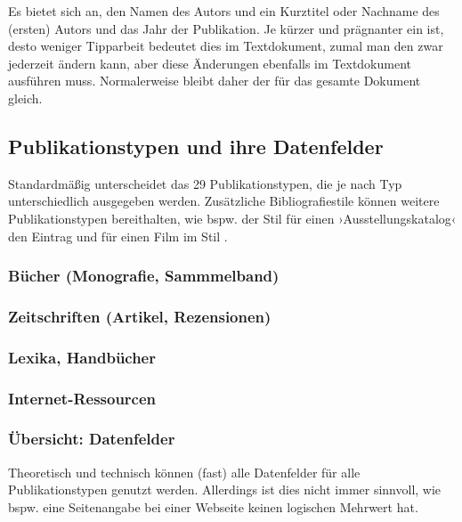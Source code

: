 Es bietet sich an, den Namen des Autors und ein Kurztitel oder Nachname des (ersten) Autors und das Jahr der Publikation. 
Je kürzer und prägnanter ein  ist, desto weniger Tipparbeit bedeutet dies im Textdokument, zumal man den  zwar jederzeit ändern kann, aber diese Änderungen ebenfalls im Textdokument ausführen muss. 
Normalerweise bleibt daher der  für das gesamte Dokument gleich.

\subsection{Publikationstypen und ihre Datenfelder}\label{lit:publikationstypus}
Standardmäßig unterscheidet das  29 %
Publikationstypen, die je nach Typ unterschiedlich ausgegeben werden.
Zusätzliche Bibliografiestile können weitere Publikationstypen bereithalten,
wie bspw. der Stil  für einen ›Ausstellungskatalog‹ den Eintrag  und  für einen Film im Stil .


\subsubsection{Bücher (Monografie, Sammmelband)}

\subsubsection{Zeitschriften (Artikel, Rezensionen)}

\subsubsection{Lexika, Handbücher}
\subsubsection{Internet-Ressourcen}

\subsubsection{Übersicht: Datenfelder}
Theoretisch und technisch können (fast) alle Datenfelder für alle Publikationstypen genutzt werden.
Allerdings ist dies nicht immer sinnvoll, wie bspw. eine Seitenangabe bei einer Webseite keinen logischen Mehrwert hat.


